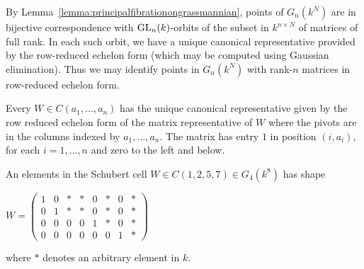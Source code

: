 \documentclass[a4paper,openany]{scrbook}
\begin{document}
\begin{remark}\label{rem:echelonform}
By Lemma~\ref{lemma:principalfibrationongrassmannian}, points of $G_n(k^N)$ are in bijective correspondence with $\operatorname{GL}_n(k)$-orbits of the subset in $k^{n\times N}$ of matrices of full rank. In each  such orbit, we have a unique canonical representative provided by the row-reduced echelon form (which may be computed using Gaussian elimination). 
Thus we may identify points in $G_n(k^N)$ with rank-$n$ matrices in row-reduced echelon form.
\end{remark}

Every $W\in C(a_1,\dots ,a_n)$ has the  unique canonical representative given by the row reduced echelon form of the matrix representative of $W$ where the pivots are in the columns indexed by $a_1,\dots ,a_n$. The matrix has entry $1$ in position $(i,a_i)$, for each $i=1,\dots ,n$ and zero to the left and below.

\begin{example} \label{ex:echelonform}
An elements in the Schubert cell $W\in C(1,2,5,7) \in G_4(k^{8})$ has shape
\begin{center}
$W = \begin{pmatrix}
  1 & 0 & * & * & 0 & * & 0 & * \\
  0 & 1 & * & * & 0 & * & 0 & * \\
  0 & 0 & 0 & 0 & 1 & * & 0 & * \\
  0 & 0 & 0 & 0 & 0 & 0 & 1 & *
 \end{pmatrix}$
\end{center}  \noindent
where $*$ denotes an arbitrary element in $k$.  
\end{example} \noindent
\end{document}
